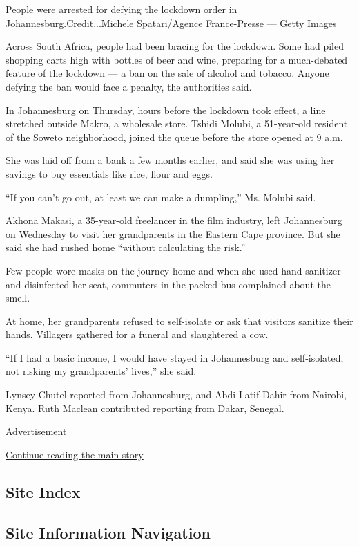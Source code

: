 People were arrested for defying the lockdown order in
Johannesburg.Credit...Michele Spatari/Agence France-Presse --- Getty
Images

Across South Africa, people had been bracing for the lockdown. ​Some had
piled shopping carts high with bottles of beer and wine, preparing for a
much-debated feature of the lockdown --- a ban on the sale of alcohol
and tobacco. Anyone defying the ban would face a penalty, the
authorities said.

In Johannesburg on Thursday, hours before the lockdown took effect, a
line stretched outside Makro, a wholesale store. Tshidi Molubi, a
51-year-old resident of the Soweto neighborhood, joined the queue before
the store opened at 9 a.m.

She was laid off from a bank a few months earlier, and said she was
using her savings to buy essentials like rice, flour and eggs.

``If you can't go out, at least we can make a dumpling,'' Ms. Molubi
said.

Akhona Makasi, a 35-year-old freelancer in the film industry, left
Johannesburg on Wednesday to visit her grandparents in the Eastern Cape
province. But she said she had rushed home ``without calculating the
risk.''

Few people wore masks on the journey home and when she used hand
sanitizer and disinfected her seat, commuters in the packed bus
complained about the smell.

At home, her grandparents refused to self-isolate or ask that visitors
sanitize their hands. Villagers gathered for a funeral and slaughtered a
cow.

``If I had a basic income, I would have stayed in Johannesburg and
self-isolated, not risking my grandparents' lives,'' she said.

Lynsey Chutel reported from Johannesburg, and Abdi Latif Dahir from
Nairobi, Kenya. Ruth Maclean contributed reporting from Dakar, Senegal.

Advertisement

\protect\hyperlink{after-bottom}{Continue reading the main story}

\hypertarget{site-index}{%
\subsection{Site Index}\label{site-index}}

\hypertarget{site-information-navigation}{%
\subsection{Site Information
Navigation}\label{site-information-navigation}}

